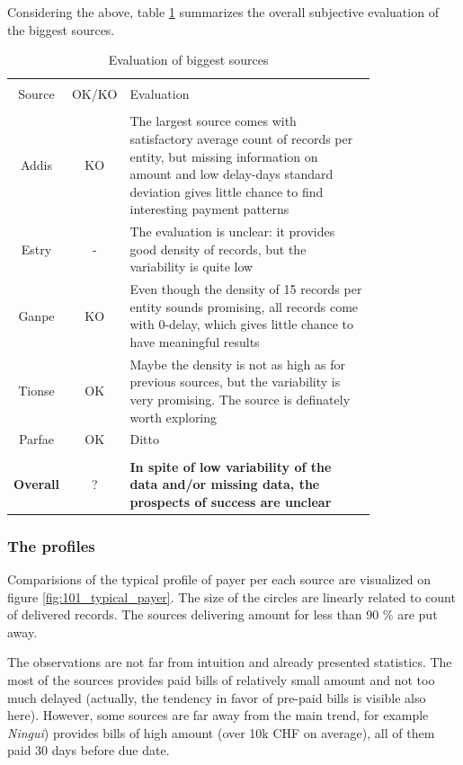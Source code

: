 \documentclass{article}
\begin{document}
Considering the above, table \ref{tab:101_big_sources_evaluation} summarizes the overall subjective evaluation of the biggest sources.

\begin{table}[!htbp]
    \centering
    \caption{Evaluation of biggest sources}
    \label{tab:101_big_sources_evaluation}
    \begin{tabular}{c c p{0.8\linewidth}}
    \hline\hline \\
    Source & OK/KO & Evaluation \\
    \hline \\
    Addis & KO & The largest source comes with satisfactory average count of records per entity, but missing information on amount and low delay-days standard deviation gives little chance to find interesting payment patterns\\
    Estry & - & The evaluation is unclear: it provides good density of records, but the variability is quite low\\
    Ganpe & KO & Even though the density of 15 records per entity sounds promising, all records come with 0-delay, which gives little chance to have meaningful results\\
    Tionse & OK & Maybe the density is not as high as for previous sources, but the variability is very promising. The source is definately worth exploring\\
    Parfae & OK & Ditto\\
    \hline \\
    \textbf{Overall} & ? & \textbf{In spite of low variability of the data and/or missing data, the prospects of success are unclear}\\
    \end{tabular}
\end{table}


\subsubsection{The profiles}

Comparisions of the typical profile of payer per each source are visualized on figure \ref{fig:101_typical_payer}.
The size of the circles are linearly related to count of delivered records.
The sources delivering amount for less than 90 \% are put away. \par
The observations are not far from intuition and already presented statistics.
The most of the sources provides paid bills of relatively small amount and not too much delayed
(actually, the tendency in favor of pre-paid bills is visible also here).
However, some sources are far away from the main trend, for example \textit{Ningui}) provides bills of high amount
(over 10k CHF on average), all of them paid 30 days before due date.
\end{document}
